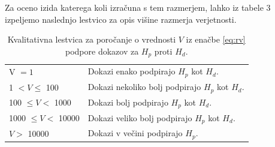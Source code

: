\documentclass[12pt,a4paper]{amsart}
\theoremstyle{definition} %
\theoremstyle{plain} %
\begin{document}
Za oceno izida katerega koli izračuna s tem razmerjem, lahko iz tabele 3 izpeljemo naslednjo lestvico za opis višine razmerja verjetnosti.
\begin{table}[h!]
    \centering
    \caption{Kvalitativna lestvica za poročanje o vrednosti $V$ iz enačbe \eqref{eq:rv} podpore dokazov za $H_p$ proti $H_d$.}
    \label{table:1}
     \begin{tabular}{l l}
        \hline
        V $= 1$ & Dokazi enako podpirajo $H_p$ kot $H_d$. \\
        1  $< V \le$  100 & Dokazi nekoliko bolj podpirajo $H_p$ kot $H_d$. \\
        100  $\le V <$  1000 & Dokazi bolj podpirajo $H_p$ kot $H_d$. \\
        1000  $\le V <$  10000 & Dokazi veliko bolj podpirajo $H_p$ kot $H_d$. \\
        $V >$ 10000 & Dokazi v večini podpirajo $H_p$. \\ [1ex]
        \hline
     \end{tabular}
 \end{table} 

\end{document}
